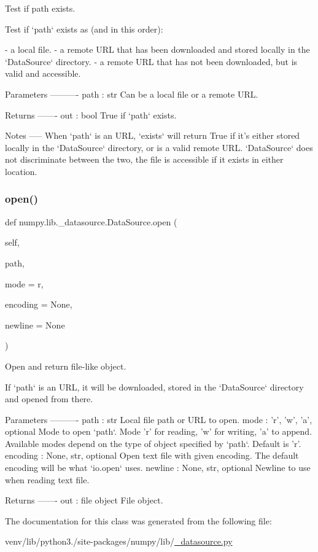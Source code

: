 \begin{DoxyVerb}Test if path exists.

Test if `path` exists as (and in this order):

- a local file.
- a remote URL that has been downloaded and stored locally in the
  `DataSource` directory.
- a remote URL that has not been downloaded, but is valid and
  accessible.

Parameters
----------
path : str
    Can be a local file or a remote URL.

Returns
-------
out : bool
    True if `path` exists.

Notes
-----
When `path` is an URL, `exists` will return True if it's either
stored locally in the `DataSource` directory, or is a valid remote
URL.  `DataSource` does not discriminate between the two, the file
is accessible if it exists in either location.\end{DoxyVerb}
 \mbox{\label{classnumpy_1_1lib_1_1__datasource_1_1DataSource_a5192a91989e5bc0a3bc6dcb6b5939f87}} 
\subsubsection{\texorpdfstring{open()}{open()}}
{\footnotesize\ttfamily def numpy.\+lib.\+\_\+datasource.\+Data\+Source.\+open (\begin{DoxyParamCaption}\item[{}]{self,  }\item[{}]{path,  }\item[{}]{mode = {\ttfamily \textquotesingle{}r\textquotesingle{}},  }\item[{}]{encoding = {\ttfamily None},  }\item[{}]{newline = {\ttfamily None} }\end{DoxyParamCaption})}

\begin{DoxyVerb}Open and return file-like object.

If `path` is an URL, it will be downloaded, stored in the
`DataSource` directory and opened from there.

Parameters
----------
path : str
    Local file path or URL to open.
mode : {'r', 'w', 'a'}, optional
    Mode to open `path`.  Mode 'r' for reading, 'w' for writing,
    'a' to append. Available modes depend on the type of object
    specified by `path`. Default is 'r'.
encoding : {None, str}, optional
    Open text file with given encoding. The default encoding will be
    what `io.open` uses.
newline : {None, str}, optional
    Newline to use when reading text file.

Returns
-------
out : file object
    File object.\end{DoxyVerb}
 

The documentation for this class was generated from the following file\+:\begin{DoxyCompactItemize}
\item 
venv/lib/python3./site-\/packages/numpy/lib/\hyperlink{__datasource_8py}{\+\_\+datasource.\+py}\end{DoxyCompactItemize}
